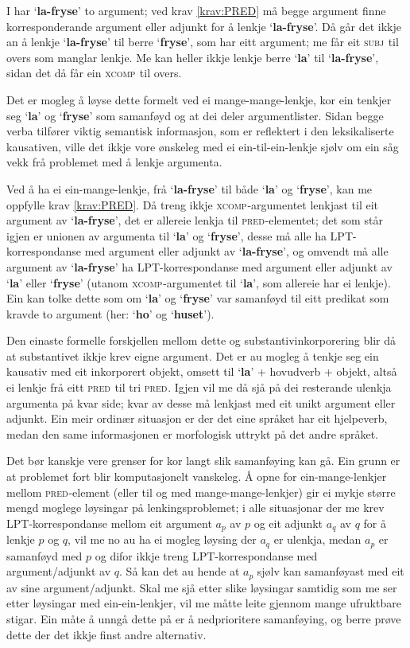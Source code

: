 \documentclass[12pt,a4paper,oneside,draft]{report}
\newcommand{\F}[2]{\textsc{#1}\ensuremath{_{#2}}}
\newcommand{\XCOMP}{\F{xcomp}{}}
\newcommand{\SUBJ}{\F{subj}{}}
\newcommand{\PRED}{\F{pred}{}}
\newcommand{\p}[1]{`\textbf{#1}'}
\begin{document}
I \Last har \p{la-fryse} to argument; ved krav \ref{krav:PRED} må
 begge argument finne korresponderande argument eller adjunkt for å
 lenkje \p{la-fryse}.  Då går det ikkje an å lenkje \p{la-fryse} til
 berre \p{fryse}, som har eitt argument; me får eit \SUBJ{} til overs
 som manglar lenkje. Me kan heller ikkje lenkje berre \p{la} til
 \p{la-fryse}, sidan det då får ein \XCOMP{} til overs.

Det er mogleg å løyse dette formelt ved ei mange-mange-lenkje, kor ein
tenkjer seg \p{la} og \p{fryse} som samanføyd og at dei deler
argumentlister. Sidan begge verba tilfører viktig semantisk
informasjon, som er reflektert i den leksikaliserte kausativen, ville
det ikkje vore ønskeleg med ei ein-til-ein-lenkje sjølv om ein såg
vekk frå problemet med å lenkje argumenta.

Ved å ha ei ein-mange-lenkje, frå \p{la-fryse} til både \p{la} og \p{fryse},
 kan me oppfylle krav \ref{krav:PRED}. Då treng ikkje
 \XCOMP{}-argumentet lenkjast til eit argument av \p{la-fryse}, det er
 allereie lenkja til \PRED{}-elementet; det som står igjen er unionen
 av argumenta til \p{la} og \p{fryse}, desse må alle ha
 LPT\hyp{}korrespondanse med argument eller adjunkt av \p{la-fryse}, og
 omvendt må alle argument av \p{la-fryse} ha LPT\hyp{}korrespondanse med
 argument eller adjunkt av \p{la} eller \p{fryse} (utanom
 \XCOMP{}-argumentet til \p{la}, som allereie har ei lenkje). Ein kan
 tolke dette som om \p{la} og \p{fryse} var samanføyd til eitt predikat
 som kravde to argument (her: \p{ho} og \p{huset}).

Den einaste formelle forskjellen mellom dette og
 substantivinkorporering blir då at substantivet ikkje krev eigne
 argument.  Det er au mogleg å tenkje seg ein kausativ med eit
 inkorporert objekt, omsett til \p{la} + hovudverb + objekt, altså ei
 lenkje frå eitt \PRED{} til tri \PRED{}. Igjen vil me då sjå på dei
 resterande ulenkja argumenta på kvar side; kvar av desse må lenkjast
 med eit unikt argument eller adjunkt. Ein meir ordinær situasjon er
 der det eine språket har eit hjelpeverb, medan den same informasjonen
 er morfologisk uttrykt på det andre språket.

Det bør kanskje vere grenser for kor langt slik samanføying kan
 gå. Ein grunn er at problemet fort blir komputasjonelt vanskeleg. Å
 opne for ein-mange-lenkjer mellom \PRED{}-element (eller til og med
 mange-mange-lenkjer) gir ei mykje større mengd moglege løysingar på
 lenkingsproblemet; i alle situasjonar der me krev LPT\hyp{}korrespondanse
 mellom eit argument $a_p$ av $p$ og eit adjunkt $a_q$ av $q$ for å
 lenkje $p$ og $q$, vil me no au ha ei mogleg løysing der $a_q$ er
 ulenkja, medan $a_p$ er samanføyd med $p$ og difor ikkje treng
 LPT\hyp{}korrespondanse med argument/adjunkt av $q$. Så kan det au hende
 at $a_p$ sjølv kan samanføyast med eit av sine argument/adjunkt. Skal
 me sjå etter slike løysingar samtidig som me ser etter løysingar med
 ein-ein-lenkjer, vil me måtte leite gjennom mange ufruktbare
 stigar. Ein måte å unngå dette på er å nedprioritere samanføying, og
 berre prøve dette der det ikkje finst andre alternativ.
\end{document}
